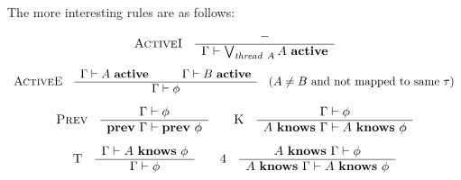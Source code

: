 The more interesting rules are as follows:
\[
\begin{array}{cc}
\mbox{\sc ActiveI}
&
\begin{array}{c}
- \\ \hline
\Gamma \vdash \bigvee_{\mathit{thread}\ A} A\ \mathbf{active}
\end{array}
\end{array}
\]\vspace{-1em}
\[
\begin{array}{ccc}
\mbox{\sc ActiveE}
&
\begin{array}{c}
\Gamma \vdash A\ \mathbf{active} \hspace*{1cm} \Gamma \vdash B\ \mathbf{active} \\ \hline
\Gamma \vdash \phi
\end{array}
&
(A\neq B \text{ and not mapped to same } \tau )
\end{array}
\]
\[
\begin{array}{cc}
\begin{array}{cc}
\mbox{\sc Prev}
&
\begin{array}{c}
\Gamma \vdash \phi \\ \hline
\mathbf{prev}\ \Gamma \vdash \mathbf{prev}\ \phi
\end{array}
\end{array}
&
\begin{array}{cc}
\mbox{\sc K}
&
\begin{array}{c}
\Gamma \vdash \phi \\ \hline
A\ \mathbf{knows}\ \Gamma \vdash A\ \mathbf{knows}\ \phi
\end{array}
\end{array}
\end{array}
\]\vspace{-0.5em}
\[
\begin{array}{cc}
\begin{array}{cc}
\mbox{\sc T}
&
\begin{array}{c}
\Gamma \vdash A\ \mathbf{knows}\ \phi \\ \hline
\Gamma \vdash \phi 
\end{array}
\end{array}
&
\begin{array}{cc}
\mbox{\sc 4}
&
\begin{array}{c}
A\ \mathbf{knows}\ \Gamma \vdash \phi \\ \hline
A\ \mathbf{knows}\ \Gamma \vdash A\ \mathbf{knows}\ \phi
\end{array}
\end{array}
\end{array}
\]

